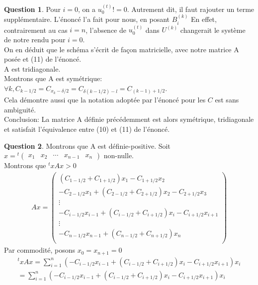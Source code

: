 \documentclass[a4paper]{article}
\theoremstyle{definition}
\newtheorem{que}{Question}
\begin{document}
\begin{que}
		Pour $i = 0$, on a $u_0^{(t)} != 0$. Autrement dit, il faut rajouter un terme supplémentaire.
		L'énoncé l'a fait pour nous, en posant $B_i^{(k)}$
		En effet, contrairement au cas $i=n$, l'absence de $u_0^{(t)}$ dans $U^{(k)}$ changerait le système de notre rendu pour $i=0$. \\

		On en déduit que le schéma s'écrit de façon matricielle, avec notre matrice A posée et (11) de l'énoncé. \\

		A est tridiagonale. \\

		Montrons que A est symétrique: $\forall k, C_{k-1/2} = C_{x_k - \delta / 2} = C_{\delta (k - 1/2) - l} = C_{(k-1)+1/2}$. \\
		Cela démontre aussi que la notation adoptée par l'énoncé pour les $C$ est sans ambiguité. \\

		Conclusion: La matrice A définie précédemment est alors symétrique, tridiagonale et satisfait l'équivalence entre (10) et (11) de l'énoncé. \\
	\end{que}
	\begin{que}
		Montrons que A est définie-positive.
		Soit $ x = {}^t \begin{pmatrix} x_1 & x_2 & \cdots & x_{n-1} & x_n \end{pmatrix}$ non-nulle. \\
		Montrons que ${}^txAx > 0$
		\begin{align*}
			Ax=
			\begin{pmatrix}
				(C_{1-1/2} + C_{1+1/2}) x_1 - C_{1+1/2} x_2 \\
				 - C_{2-1/2} x_1 + (C_{2-1/2} + C_{2+1/2}) x_2 - C_{2+1/2} x_3 \\
				\vdots \\
				- C_{i-1/2} x_{i-1} + (C_{i-1/2} + C_{i+1/2}) x_i - C_{i+1/2} x_{i+1} \\
				\vdots \\
				- C_{n-1/2} x_{n-1} + (C_{n-1/2} + C_{n+1/2}) x_n \\
			\end{pmatrix}
		\end{align*}
		Par commodité, posons $ x_0 = x_{n+1} = 0$
		\begin{align*}
			{}^txAx=\sum_{i=1}^n (- C_{i-1/2} x_{i-1} + (C_{i-1/2} + C_{i+1/2}) x_i - C_{i+1/2} x_{i+1}) x_i \\
			= \sum_{i=1}^n (- C_{i-1/2} x_{i-1} + (C_{i-1/2} + C_{i+1/2}) x_i - C_{i+1/2} x_{i+1}) x_i \\
		\end{align*}

	\end{que}
\end{document}
